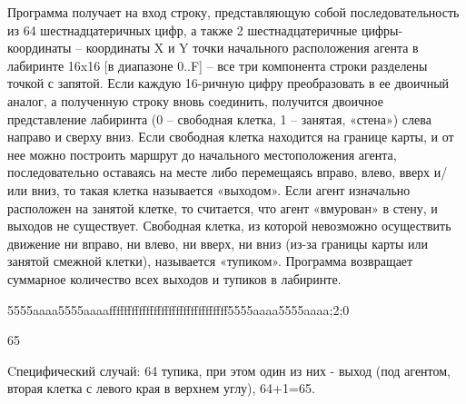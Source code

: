 
Программа получает на вход строку, представляющую собой последовательность из 64 шестнадцатеричных цифр, а также 2 шестнадцатеричные цифры-координаты – координаты X и Y точки начального расположения агента в лабиринте 16x16 [в диапазоне 0..F] – все три компонента строки разделены точкой с запятой. Если каждую 16-ричную цифру преобразовать в ее двоичный аналог, а полученную строку вновь соединить, получится двоичное представление лабиринта (0 – свободная клетка, 1 – занятая, «стена») слева направо и сверху вниз. Если свободная клетка находится на границе карты, и от нее можно построить маршрут до начального местоположения агента, последовательно оставаясь на месте либо перемещаясь вправо, влево, вверх и/или вниз, то такая клетка называется «выходом». Если агент изначально расположен на занятой клетке, то считается, что агент «вмурован» в стену, и выходов не существует. Свободная клетка, из которой невозможно осуществить движение ни вправо, ни влево, ни вверх, ни вниз (из-за границы карты или занятой смежной клетки), называется «тупиком». Программа возвращает суммарное количество всех выходов и тупиков в лабиринте.

\begin{myverbbox}[\small]{\vinput}
    5555aaaa5555aaaaffffffffffffffffffffffffffffffff5555aaaa5555aaaa;2;0
\end{myverbbox}
\begin{myverbbox}[\small]{\voutput}
    65
\end{myverbbox}

Cпецифический случай: 64 тупика, при этом один из них - выход (под агентом, вторая клетка с левого края в верхнем углу), 64+1=65.

